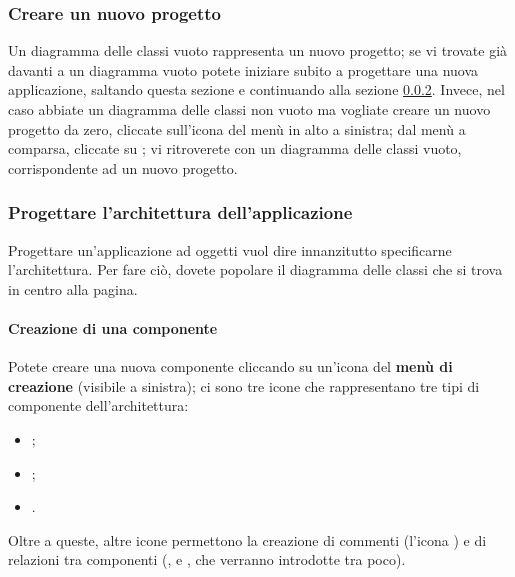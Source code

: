 \subsubsection{Creare un nuovo progetto}
Un diagramma delle classi vuoto rappresenta un nuovo progetto; se vi trovate già davanti a un diagramma vuoto potete iniziare subito a progettare una nuova applicazione, saltando questa sezione e continuando alla sezione \ref{par:arch}. Invece, nel caso abbiate un diagramma delle classi non vuoto ma vogliate creare un nuovo progetto da zero, cliccate sull'icona del menù in alto a sinistra; dal menù a comparsa, cliccate su ; vi ritroverete con un diagramma delle classi vuoto, corrispondente ad un nuovo progetto.

\subsubsection{Progettare l'architettura dell'applicazione} \label{par:arch}
Progettare un'applicazione ad oggetti vuol dire innanzitutto specificarne l'architettura. Per fare ciò, dovete popolare il diagramma delle classi che si trova in centro alla pagina.

\paragraph{Creazione di una componente} Potete creare una nuova componente cliccando su un'icona del \textbf{menù di creazione} (visibile a sinistra); ci sono tre icone che rappresentano tre tipi di componente dell'architettura:
\begin{itemize}
	\item {};
	\item {};
	\item {}.
\end{itemize}
Oltre a queste, altre icone permettono la creazione di commenti (l'icona ) e di relazioni tra componenti (,  e , che verranno introdotte tra poco).


